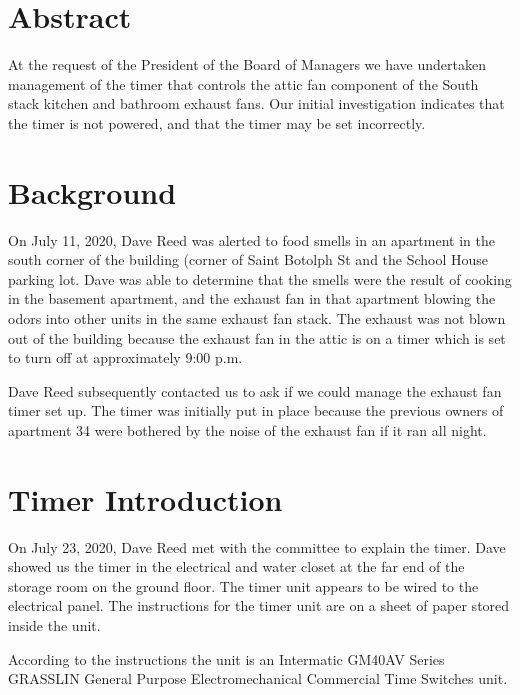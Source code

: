 \documentclass[letterpaper,12pt]{texMemo}
\begin{document}
\maketitle

\section{Abstract}

At the request of the President of the Board of Managers we have undertaken
management of the timer that controls the attic fan component of the South
stack kitchen and bathroom exhaust fans. Our initial investigation indicates
that the timer is not powered, and that the timer may be set incorrectly.

\section{Background}

On July 11, 2020, Dave Reed was alerted to food smells
in an apartment in the south corner of the building (corner of Saint
Botolph St and the School House parking lot. Dave was able to
determine that the smells were the result of cooking in the basement
apartment, and the exhaust fan in that apartment blowing the odors
into other units in the same exhaust fan stack. The exhaust was not
blown out of the building because the exhaust fan in the attic is on
a timer which is set to turn off at approximately 9:00 p.m.

Dave Reed subsequently contacted us to ask if we could manage the
exhaust fan timer set up. The timer was initially put in place because
the previous owners of apartment 34 were bothered by the noise of
the exhaust fan if it ran all night.

\section{Timer Introduction}

On July 23, 2020, Dave Reed met with the committee to explain
the timer. Dave showed us the timer in the electrical and water closet at
the far end of the storage room on the ground floor. The timer unit appears
to be wired to the electrical panel. The instructions for the timer unit are
on a sheet of paper stored inside the unit.

According to the instructions the unit is an Intermatic GM40AV Series
GRASSLIN General Purpose Electromechanical Commercial Time Switches unit.
\end{document}
